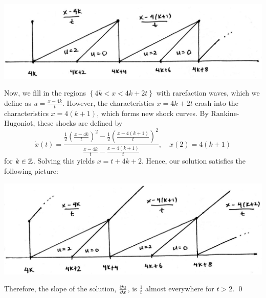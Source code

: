 \begin{center}
\includegraphics[scale=0.4]{./_Figures/f128img2.png}
\end{center}

Now, we fill in the regions $ \left\{ 4k < x < 4k+2t \right\}$ with rarefaction waves, which we define as $u = \frac{x-4k}{t}$. However, the characteristics $x = 4k+2t$ crash into the characteristics $x=4(k+1)$, which forms new shock curves. By Rankine-Hugoniot, these shocks are defined by
$$ \dot{x}(t) = \dfrac{\frac{1}{2} \left( \frac{x-4k}{t} \right)^2 - \frac{1}{2} \left( \frac{x-4(k+1)}{t} \right)^2}{\frac{x-4k}{t} - \frac{x-4(k+1)}{t}}, \quad x(2) = 4(k+1) $$
for $k \in \mathbb{Z}$. Solving this yields $x = t + 4k + 2$. Hence, our solution satisfies the following picture:

\begin{center}
\includegraphics[scale=0.4]{./_Figures/f128img3.png}
\end{center}

Therefore, the slope of the solution, $\frac{\partial u}{\partial x}$, is $\frac{1}{t}$ almost everywhere for $t>2$. \hfill \qed

